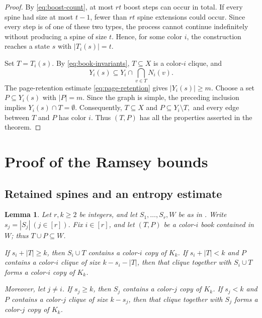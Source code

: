 \documentclass[twoside,12pt]{article}
\newtheorem{lemma}[theorem]{Lemma}
\theoremstyle{definition}
\theoremstyle{remark}
\newcommand{\1}{\mathbf 1}
\begin{document}
\begin{proof}
By \eqref{eq:boost-count}, at most $rt$ boost steps can occur in total. If
every spine had size at most $t-1$, fewer than $rt$ spine extensions could
occur. Since every step is of one of these two types, the process cannot
continue indefinitely without producing a spine of size $t$. Hence, for some
color $i$, the construction reaches a state $s$ with $|T_i(s)|=t$.

Set $T=T_i(s)$. By \eqref{eq:book-invariants}, $T\subseteq X$ is a
color-$i$ clique, and
\[
 Y_i(s)\subseteq Y_i\cap\bigcap_{v\in T}N_i(v).
\]
The page-retention estimate \eqref{eq:page-retention} gives
$|Y_i(s)|\ge m$. Choose a set $P\subseteq Y_i(s)$ with $|P|=m$. Since the
graph is simple, the preceding inclusion implies $Y_i(s)\cap T=\emptyset$.
Consequently,
$
 T\subseteq X$ and
 $P\subseteq Y_i\setminus T,$
and every edge between $T$ and $P$ has color $i$. Thus $(T,P)$ has all the
properties asserted in the theorem.
\end{proof}

\section{Proof of the Ramsey bounds}\label{sec:transfer}

\subsection{Retained spines and an entropy estimate}\label{sec:spines}

\begin{lemma}\label{lem:spine-compatibility}
Let $r,k\ge2$ be integers, and let $S_1,\ldots,S_r,W$ be as in
. Write
$
 s_j=|S_j|
~(j\in[r]).
$
Fix $i\in[r]$, and let $(T,P)$ be a color-$i$ book contained in $W$; thus
$T\cup P\subseteq W$.

If $s_i+|T|\ge k$, then $S_i\cup T$ contains a color-$i$ copy of $K_k$. If
$s_i+|T|<k$ and $P$ contains a color-$i$ clique of size
$k-s_i-|T|$, then that clique together with $S_i\cup T$ forms a color-$i$
copy of $K_k$.

Moreover, let $j\ne i$. If $s_j\ge k$, then $S_j$ contains a color-$j$ copy
of $K_k$. If $s_j<k$ and $P$ contains a color-$j$ clique of size $k-s_j$,
then that clique together with $S_j$ forms a color-$j$ copy of $K_k$.
\end{lemma}
\end{document}

